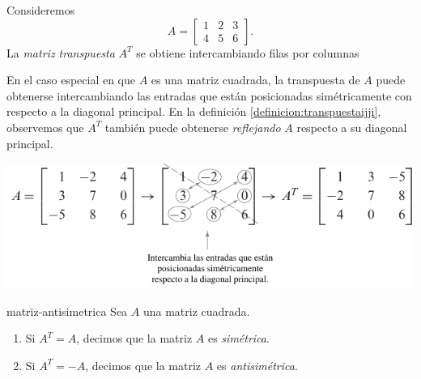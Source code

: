 \begin{examplebox}{}{}
    Consideremos
    $$A = \begin{bmatrix}
        1 & 2 & 3 \\
        4 & 5 & 6
    \end{bmatrix}.$$
    La \emph{matriz transpuesta} $A^T$ se obtiene intercambiando filas por columnas
    \begin{matrizn}
    \end{matrizn}
\end{examplebox}

En el caso especial en que $A$ es una matriz cuadrada, la transpuesta de $A$ puede obtenerse intercambiando las entradas que están posicionadas simétricamente con respecto a la diagonal principal. En la definición \ref{definicion:transpuestaijji}, observemos que $A^T$ también puede obtenerse \textit{reflejando} $A$ respecto a su diagonal principal.
\begin{matrizn}
    \includegraphics{Images/Capitulo2/Transpuesta.pdf}
\end{matrizn}

\begin{definicion}{}{matriz-antisimetrica}
    Sea $A$ una matriz cuadrada.
    \begin{enumerate}[label=\roman*), topsep=6pt, itemsep=0pt]
        \item Si $A^T = A$, decimos que la matriz $A$ es \emph{simétrica}.
        \item Si $A^T = -A$, decimos que la matriz $A$ es \emph{antisimétrica}.
    \end{enumerate}
\end{definicion}

